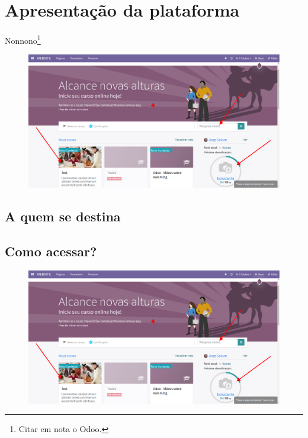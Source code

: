 \captionsetup{justification=raggedright, singlelinecheck=false}

\chapter{Apresentação da plataforma}

\lipsum[1]

Nonnono\footnote{Citar em nota o Odoo.}


\begin{figure}[t]
\includegraphics[width=\textwidth]{imgs/screenshot1}
\end{figure}


\section{A quem se destina}

\lipsum[1-3]

\section{Como acessar?}


\lipsum[1-3]
\begin{figure}[t]
\includegraphics[width=\textwidth]{imgs/screenshot2}
\end{figure}

